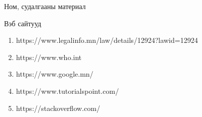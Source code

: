 \begin{center}
Ном, судалгааны материал
\end{center}

\begin{center}
Вэб сайтууд
\end{center}
\begin{enumerate}
\item https://www.legalinfo.mn/law/details/12924?lawid=12924
\item https://www.who.int
\item https://www.google.mn/
\item https://www.tutorialspoint.com/
\item https://stackoverflow.com/
\end{enumerate}
